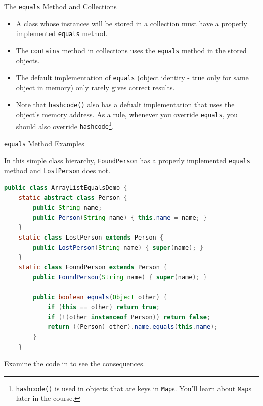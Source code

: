 \documentclass{beamer}
\begin{document}
\begin{frame}[fragile]{The {\tt equals} Method and Collections}



\begin{itemize}
\item A class whose instances will be stored in a collection must have a properly implemented {\tt equals} method.
\item The {\tt contains} method in collections uses the {\tt equals} method in the stored objects.
\item The default implementation of {\tt equals} (object identity - true only for same object in memory) only rarely gives correct results.
\item Note that {\tt hashcode()} also has a defualt implementation that uses the object's memory address.  As a rule, whenever you override {\tt equals}, you should also override {\tt hashcode}\footnote{{\tt hashcode()} is used in objects that are keys in {\tt Map}s.  You'll learn about {\tt Map}s later in the course.}.
\end{itemize}


\end{frame}

\begin{frame}[fragile]{{\tt equals} Method Examples}


In this simple class hierarchy, {\tt FoundPerson} has a properly implemented {\tt equals} method and {\tt LostPerson} does not.
\begin{lstlisting}[language=Java]
public class ArrayListEqualsDemo {
    static abstract class Person {
        public String name;
        public Person(String name) { this.name = name; }
    }
    static class LostPerson extends Person {
        public LostPerson(String name) { super(name); }
    }
    static class FoundPerson extends Person {
        public FoundPerson(String name) { super(name); }

        public boolean equals(Object other) {
            if (this == other) return true;
            if (!(other instanceof Person)) return false;
            return ((Person) other).name.equals(this.name);
        }
    }
\end{lstlisting}

Examine the code in  to see the consequences.

\end{frame}
\end{document}
